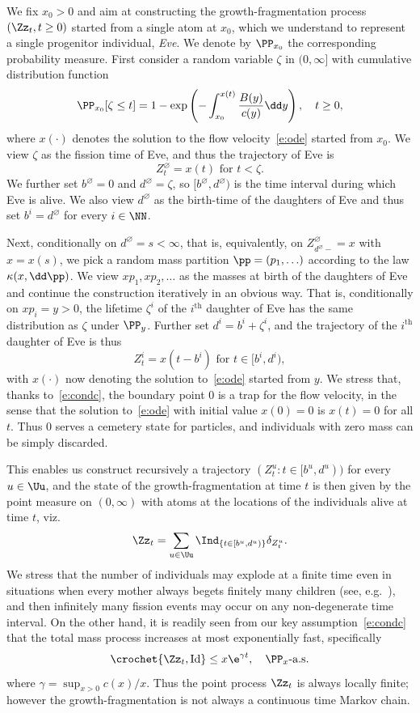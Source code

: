 We fix $x_0>0$ and aim at constructing the growth-fragmentation process $(\Zz_t, t\geq 0)$ started from a single atom at $x_0$, which we understand to represent a single progenitor individual, \emph{Eve}. We denote by $\PP_{x_0}$ the corresponding probability measure. First consider a random variable $\zeta $ in $(0, \infty]$ with cumulative distribution function
\[
\PP_{x_0}[\zeta \leq t]= 1-\exp\left(-\int_{x_0}^{x(t)} \frac{{B}(y)}{c(y)}\dd y\right), \quad t\geq 0,
\]
where $x(\cdot)$ denotes the solution to the flow velocity~\eqref{e:ode} started from $x_0$. We view $\zeta $ as the fission time of Eve, and thus the trajectory of Eve is
\[
Z_t^{\varnothing}=x(t) \text{ for }t<\zeta.
\]
We further set $b^{\varnothing}= 0$ and $d^{\varnothing}=\zeta $, so $[b^{\varnothing}, d^{\varnothing})$ is the time interval during which Eve is alive. We also view $d^{\varnothing}$ as the birth-time of the daughters of Eve and thus set $b^i=d^{\varnothing}$ for every $i\in\NN$.
\goodbreak

Next, conditionally on $d^{\varnothing}=s<\infty$, that is, equivalently, on $Z_{d^{\varnothing}-}^{\varnothing}=x$ with $x=x(s)$, we pick a random mass partition $\pp=(p_1, \ldots)$ according to the law $\kappa(x,\dd \pp)$. We view $xp_1, xp_2, \ldots$ as the masses at birth of the daughters of Eve and continue the construction iteratively in an obvious way. That is, conditionally on $xp_i=y>0$, the lifetime $\zeta^i$ of the $i^{\text{th}}$ daughter of Eve has the same distribution as $\zeta $ under $\PP_{y}$. Further set $d^i=b^i+\zeta^i$, and the trajectory of the $i^{\text {th}}$ daughter of Eve is thus
\[
Z_{t}^{i}=x(t-b^i) \text{ for }t\in[b^i,d^i),
\]
with $x(\cdot)$ now denoting the solution to~\eqref{e:ode} started from $y$. We stress that, thanks to~\eqref{e:condc}, the boundary point $0$ is a trap for the flow velocity, in the sense that the solution to~\eqref{e:ode} with initial value $x(0)=0$ is $x(t)=0$ for all $t$. Thus $0$ serves a cemetery state for particles, and individuals with zero mass can be simply discarded.

This enables us construct recursively a trajectory $(Z^u_t: t\in[b^u, d^u))$ for every $u\in \Uu$, and the state of the growth-fragmentation at time $t$ is then given by the point measure on $(0,\infty)$ with atoms at the locations of the individuals alive at time $t$, viz.
\[
\Zz_t = \sum_{u\in\Uu} \Ind_{\{t\in[b^u, d^u)\}} \delta_{Z^u_t}.
\]
We stress that the number of individuals may explode at a finite time even in situations when every mother always begets finitely many children (see, e.g.~\cite{Savits}), and then infinitely many fission events may occur on any non-degenerate time interval. On the other hand, it is readily seen from our key assumption~\eqref{e:condc} that the total mass process increases at most exponentially fast, specifically
\[
\crochet{\Zz_t, {\mathrm {Id}}}\leq x\e^{\gamma t}, \quad \PP_x{\text{-a.s.}}
\]
where $\gamma=\sup_{x>0} c(x)/x$. Thus the point process $\Zz_t$ is always locally finite; however the growth-fragmentation is not always a continuous time Markov chain.


